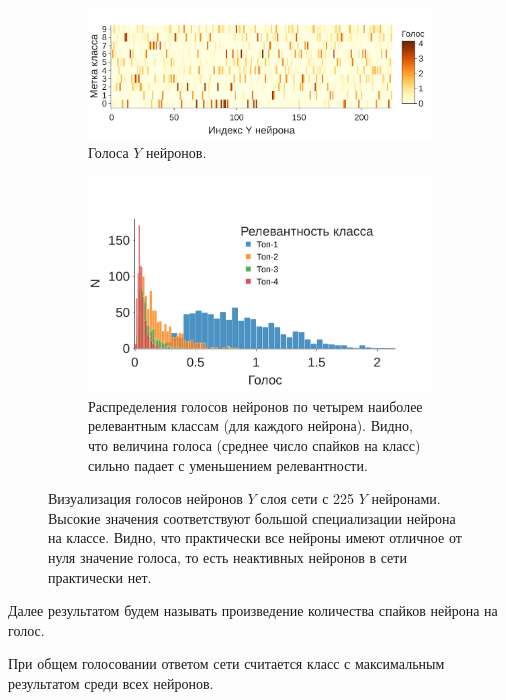 \documentclass[a4paper]{article}
\begin{document}
\begin{figure}
\centering
\begin{subfigure}{\textwidth}
    \includegraphics[width=\textwidth,keepaspectratio=true]{votes_ru.pdf}
    \caption{Голоса $Y$ нейронов.}
\end{subfigure}
\begin{subfigure}{\textwidth} 
    \includegraphics[width=\textwidth,keepaspectratio=true]{votes_distr_4_ru.pdf}
    \caption{Распределения голосов нейронов по четырем наиболее релевантным классам (для каждого нейрона). Видно, что величина голоса (среднее число спайков на класс) сильно падает с уменьшением релевантности.}
\end{subfigure}
\caption{Визуализация голосов нейронов $Y$ слоя сети с 225 $Y$ нейронами. Высокие значения соответствуют большой специализации нейрона на классе. Видно, что практически все нейроны имеют отличное от нуля значение голоса, то есть неактивных нейронов в сети практически нет.}
\end{figure}

Далее результатом будем называть произведение количества спайков нейрона на голос.

При общем голосовании ответом сети считается класс с максимальным результатом среди всех нейронов.
\end{document}
